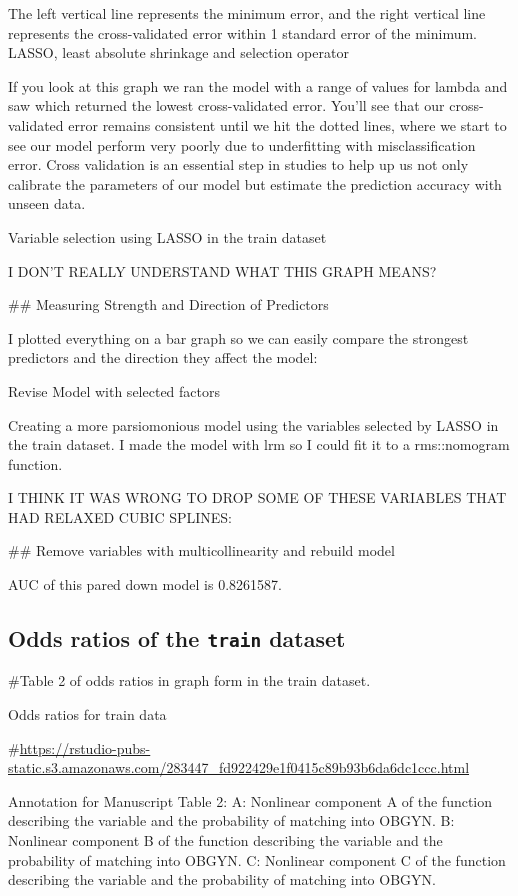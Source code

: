\documentclass[12pt,]{article}
\begin{document}
The left vertical line represents the minimum error, and the right
vertical line represents the cross-validated error within 1 standard
error of the minimum. LASSO, least absolute shrinkage and selection
operator

If you look at this graph we ran the model with a range of values for
lambda and saw which returned the lowest cross-validated error. You'll
see that our cross-validated error remains consistent until we hit the
dotted lines, where we start to see our model perform very poorly due to
underfitting with misclassification error. Cross validation is an
essential step in studies to help up us not only calibrate the
parameters of our model but estimate the prediction accuracy with unseen
data.

Variable selection using LASSO in the train dataset

I DON'T REALLY UNDERSTAND WHAT THIS GRAPH MEANS?

\#\# Measuring Strength and Direction of Predictors

I plotted everything on a bar graph so we can easily compare the
strongest predictors and the direction they affect the model:

Revise Model with selected factors

Creating a more parsiomonious model using the variables selected by
LASSO in the train dataset. I made the model with lrm so I could fit it
to a rms::nomogram function.

I THINK IT WAS WRONG TO DROP SOME OF THESE VARIABLES THAT HAD RELAXED
CUBIC SPLINES:

\#\# Remove variables with multicollinearity and rebuild model

AUC of this pared down model is 0.8261587.

\hypertarget{odds-ratios-of-the-train-dataset}{%
\subsection{\texorpdfstring{Odds ratios of the \texttt{train}
dataset}{Odds ratios of the train dataset}}\label{odds-ratios-of-the-train-dataset}}

\#Table 2 of odds ratios in graph form in the train dataset.

Odds ratios for train data

\#\url{https://rstudio-pubs-static.s3.amazonaws.com/283447_fd922429e1f0415c89b93b6da6dc1ccc.html}

Annotation for Manuscript Table 2: A: Nonlinear component A of the
function describing the variable and the probability of matching into
OBGYN. B: Nonlinear component B of the function describing the variable
and the probability of matching into OBGYN. C: Nonlinear component C of
the function describing the variable and the probability of matching
into OBGYN.
\end{document}
